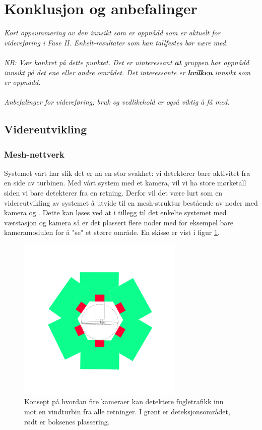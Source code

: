 \section{Konklusjon og anbefalinger}
\label{sec:konklusjon}
\textit{Kort oppsummering av den innsikt som er oppnådd som er aktuelt for videreføring i Fase II. Enkelt-resultater som kan tallfestes bør være med.\\
\\
NB: Vær konkret på dette punktet. Det er uinteressant \textbf{at} gruppen har oppnådd innsikt på det ene eller andre området. Det interessante er \textbf{hvilken} innsikt som er oppnådd. \\
\\
Anbefalinger for videreføring, bruk og vedlikehold er også viktig å få med.}


\subsection{Videreutvikling}

\subsubsection{Mesh-nettverk}

Systemet vårt har slik det er nå en stor svakhet: vi detekterer bare aktivitet fra en side av turbinen. Med vårt system med et kamera, vil vi ha store mørketall siden vi bare detekterer fra en retning. Derfor vil det være lurt som en videreutvikling av systemet å utvide til en mesh-struktur bestående av noder med kamera og  . Dette kan løses ved at i tillegg til det enkelte systemet med værstasjon og kamera så er det plassert flere noder med for eksempel bare kameramodulen for å "se" et større område. En skisse er vist i figur \ref{fig:fraoven}.

\begin{figure}[H]
    \centering
    \includegraphics[width=0.7\textwidth]{konklusjon/Nettverk.png}
    \caption{Konsept på hvordan fire kameraer kan detektere fugletrafikk inn mot en vindturbin fra alle retninger. I grønt er deteksjonsområdet, rødt er boksenes plassering.}
    \label{fig:fraoven}
\end{figure}


